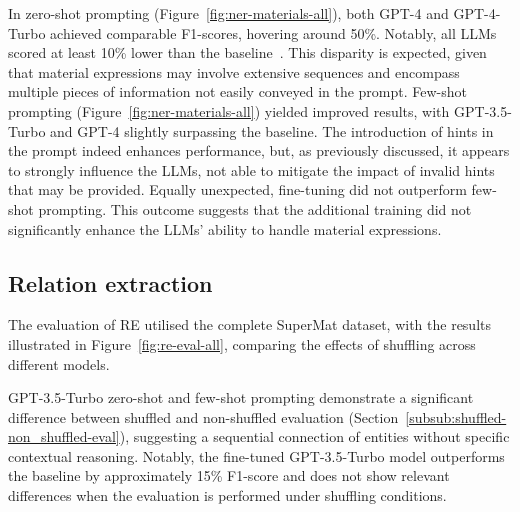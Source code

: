 In zero-shot prompting (Figure~\ref{fig:ner-materials-all}), both GPT-4 and GPT-4-Turbo achieved comparable F1-scores, hovering around 50\%. Notably, all LLMs scored at least 10\% lower than the baseline~\cite{lfoppiano2023automatic}. This disparity is expected, given that material expressions may involve extensive sequences and encompass multiple pieces of information not easily conveyed in the prompt.
Few-shot prompting (Figure~\ref{fig:ner-materials-all}) yielded improved results, with GPT-3.5-Turbo and GPT-4 slightly surpassing the baseline. 
The introduction of hints in the prompt indeed enhances performance, but, as previously discussed, it appears to strongly influence the LLMs, not able to mitigate the impact of invalid hints that may be provided.
Equally unexpected, fine-tuning did not outperform few-shot prompting. This outcome suggests that the additional training did not significantly enhance the LLMs' ability to handle material expressions.

\subsection{Relation extraction}
\label{sec:results-re}

The evaluation of RE utilised the complete SuperMat dataset, with the results illustrated in Figure~\ref{fig:re-eval-all}, comparing the effects of shuffling across different models. 


GPT-3.5-Turbo zero-shot and few-shot prompting demonstrate a significant difference between shuffled and non-shuffled evaluation (Section~\ref{subsub:shuffled-non_shuffled-eval}), suggesting a sequential connection of entities without specific contextual reasoning.
Notably, the fine-tuned GPT-3.5-Turbo model outperforms the baseline by approximately 15\% F1-score and does not show relevant differences when the evaluation is performed under shuffling conditions.

